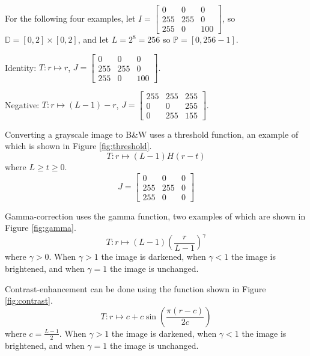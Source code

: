 For the following four examples, let $I = \begin{bmatrix}
    0 & 0 & 0\\ 255 & 255 & 0 \\ 255 & 0 & 100
\end{bmatrix}$, so $\mathbb{D} = \left[0, 2\right] \times \left[0, 2\right]$, and let $L = 2^8 = 256$ so $\mathbb{P} = \left[0, 256 - 1\right]$.

\begin{exmp}
    Identity: $T: r \mapsto r$, $J = \begin{bmatrix}
        0 & 0 & 0\\ 255 & 255 & 0 \\ 255 & 0 & 100
    \end{bmatrix}$.
\end{exmp}

\begin{exmp}
    Negative: $T: r \mapsto (L-1) - r$, $J = \begin{bmatrix}
        255 & 255 & 255 \\ 0 & 0 & 255 \\ 0 & 255 & 155
    \end{bmatrix}$.
\end{exmp}

\begin{exmp}
    Converting a grayscale image to B\&W uses a threshold function, an example of which is shown in Figure \ref{fig:threshold}. \[T: r \mapsto (L-1)H(r - t)\] where $L \geq t \geq 0$. \[J = \begin{bmatrix}
        0 & 0 & 0\\ 255 & 255 & 0 \\ 255 & 0 & 0
    \end{bmatrix}\]
\end{exmp}

\begin{exmp}
    Gamma-correction uses the gamma function, two examples of which are shown in Figure \ref{fig:gamma}. \[T: r \mapsto (L-1)\left(\frac{r}{L-1}\right)^\gamma\] where $\gamma > 0$. When $\gamma > 1$ the image is darkened, when $\gamma < 1$ the image is brightened, and when $\gamma = 1$ the image is unchanged.
\end{exmp}

\begin{exmp}
    Contrast-enhancement can be done using the function shown in Figure \ref{fig:contrast}. \[T: r \mapsto c + c\sin\left(\frac{\pi(r-c)}{2c}\right)\] where $c = \frac{L - 1}{2}$. When $\gamma > 1$ the image is darkened, when $\gamma < 1$ the image is brightened, and when $\gamma = 1$ the image is unchanged.
\end{exmp}

